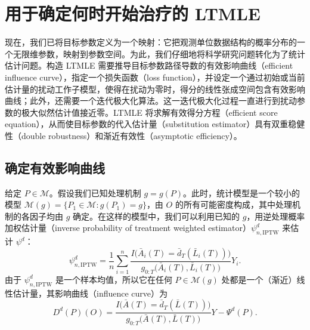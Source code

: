\section{用于确定何时开始治疗的 LTMLE}
\label{sec:ch04-ltmle-start-treatment}

\begin{sourcebox}
现在，我们已将目标参数定义为一个映射：它把观测单位数据结构的概率分布的一个无限维参数，映射到参数空间。为此，我们仔细地将科学研究问题转化为了统计估计问题。构造 LTMLE 需要推导目标参数路径导数的有效影响曲线（efficient influence curve），指定一个损失函数（loss function），并设定一个通过初始或当前估计量的扰动工作子模型，使得在扰动为零时，得分的线性张成空间包含有效影响曲线；此外，还需要一个迭代极大化算法。这一迭代极大化过程一直进行到扰动参数的极大似然估计值接近零。LTMLE 将求解有效得分方程（efficient score equation），从而使目标参数的代入估计量（substitution estimator）具有双重稳健性（double robustness）和渐近有效性（asymptotic efficiency）。
\end{sourcebox}

\subsection{确定有效影响曲线}
\label{subsec:ch04-eic}

给定 $P\in\mathcal M$。假设我们已知处理机制 $g=g(P)$。此时，统计模型是一个较小的模型
$\mathcal M(g)=\{P_1\in\mathcal M:g(P_1)=g\}$，由 $O$ 的所有可能密度构成，其中处理机制的各因子均由 $g$ 确定。在这样的模型中，我们可以利用已知的 $g$，用逆处理概率加权估计量（inverse probability of treatment weighted estimator）$\psi^d_{n,\mathrm{IPTW}}$ 来估计 $\psi^d$：
\[
 \psi^d_{n,\mathrm{IPTW}}
 =\frac1n\sum_{i=1}^n
 \frac{I\bigl(\bar A_i(T)=\bar d_T(\bar L_i(T))\bigr)}
      {g_{0:T}\bigl(\bar A_i(T),\bar L_i(T)\bigr)}Y_i.
\]
由于 $\psi^d_{n,\mathrm{IPTW}}$ 是一个样本均值，所以它在任何 $P\in\mathcal M(g)$ 处都是一个（渐近）线性估计量，其影响曲线（influence curve）为
\[
 D^d(P)(O)
 =\frac{I\bigl(\bar A(T)=\bar d_T(\bar L(T))\bigr)}
       {g_{0:T}\bigl(\bar A(T),\bar L(T)\bigr)}Y-\Psi^d(P).
\]

